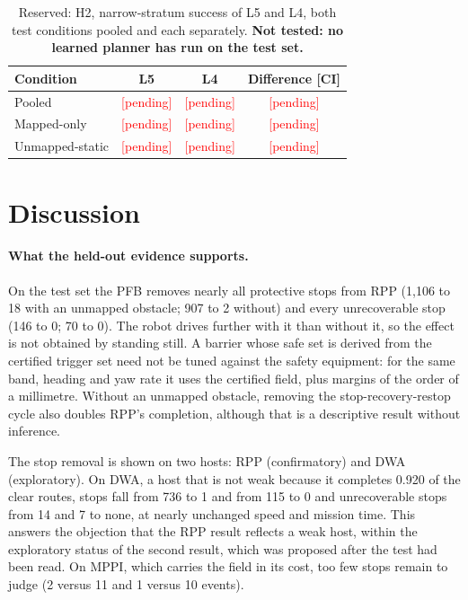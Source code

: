 \documentclass[11pt]{article}
\newcommand{\pending}[1][held-out: pending]{\textcolor{red}{[#1]}}
\theoremstyle{definition}
\begin{document}
\begin{table}[!htbp]
\centering
\caption{Reserved: H2, narrow-stratum success of L5 and L4, both test conditions pooled and each separately.
\textbf{Not tested: no learned planner has run on the test set.}}
\label{tab:h2}
\small
\renewcommand{\pending}{\textcolor{red}{[pending]}}
\begin{tabular}{lccc}
\toprule
Condition & L5 & L4 & Difference [CI]\\
\midrule
Pooled & \pending & \pending & \pending\\
Mapped-only & \pending & \pending & \pending\\
Unmapped-static & \pending & \pending & \pending\\
\bottomrule
\end{tabular}
\end{table}

\section{Discussion}\label{sec:discussion}

\paragraph{What the held-out evidence supports.} On the test set the PFB removes nearly all protective stops from
RPP (1{,}106 to 18 with an unmapped obstacle; 907 to 2 without) and every unrecoverable stop (146 to 0; 70 to 0). The
robot drives further with it than without it, so the effect is not obtained by standing still. A barrier whose
safe set is derived from the certified trigger set need not be tuned against the safety equipment: for the same band,
heading and yaw rate it uses the certified field, plus margins of the order of a millimetre. Without an unmapped
obstacle, removing the stop-recovery-restop cycle also doubles RPP's completion, although that is a descriptive result
without inference.

The stop removal is shown on two hosts: RPP (confirmatory) and DWA (exploratory). On DWA, a host that is not weak
because it completes 0.920 of the clear routes, stops fall from 736 to 1 and from 115 to 0 and unrecoverable stops from 14
and 7 to none, at nearly unchanged speed and mission time. This answers the objection that the RPP result reflects a weak
host, within the exploratory status of the second result, which was proposed after the test had been read. On MPPI, which
carries the field in its cost, too few stops remain to judge (2 versus 11 and 1 versus 10 events).
\end{document}
